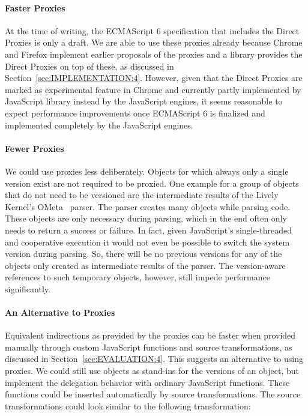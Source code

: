 \paragraph{Faster Proxies}
At the time of writing, the ECMAScript 6 specification that includes the Direct Proxies is only a draft.
We are able to use these proxies already because Chrome and Firefox implement earlier proposals of the proxies and a library provides the Direct Proxies on top of these, as discussed in Section~\ref{sec:IMPLEMENTATION:4}.
However, given that the Direct Proxies are marked as experimental feature in Chrome and currently partly implemented by JavaScript library instead by the JavaScript engines, it seems reasonable to expect performance improvements once ECMAScript 6 is finalized and implemented completely by the JavaScript engines.

\paragraph{Fewer Proxies}
We could use proxies less deliberately.
Objects for which always only a single version exist are not required to be proxied.
One example for a group of objects that do not need to be versioned are the intermediate results of the Lively Kernel's OMeta~\cite{Warth2007OOL} parser.
The parser creates many objects while parsing code.
These objects are only necessary during parsing, which in the end often only needs to return a success or failure.
In fact, given JavaScript's single-threaded and cooperative execution it would not even be possible to switch the system version during parsing.
So, there will be no previous versions for any of the objects only created as intermediate results of the parser.
The version-aware references to such temporary objects, however, still impede performance significantly.

\paragraph{An Alternative to Proxies}
Equivalent indirections as provided by the proxies can be faster when provided manually through custom JavaScript functions and source transformations, as discussed in Section~\ref{sec:EVALUATION:4}.
This suggests an alternative to using proxies.
We could still use objects as stand-ins for the versions of an object, but implement the delegation behavior with ordinary JavaScript functions.
These functions could be inserted automatically by source transformations.
The source transformations could look similar to the following transformation:

